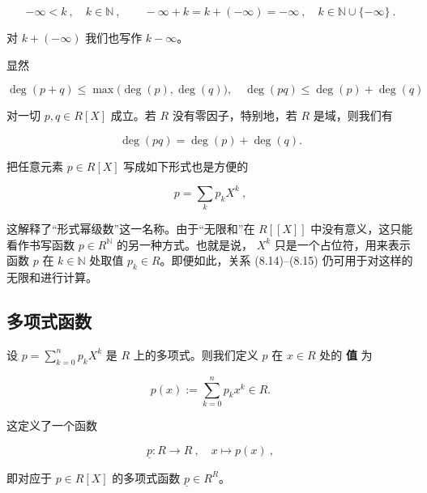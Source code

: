 \begin{equation}
-\infty<k~,\quad k\in\mathbb{N}~,\qquad-\infty+k=k+(-\infty)=-\infty~,\quad k\in\mathbb{N}\cup\{-\infty\}~.
\end{equation}

对  $ k + (-\infty) $ 我们也写作  $ k - \infty $。

显然

\begin{equation}
\deg(p+q)\leq\max\bigl(\deg(p),\deg(q)\bigr),\quad\deg(pq)\leq\deg(p)+\deg(q)
\end{equation}

对一切 $p, q \in R[X]$ 成立。若 $R$ 没有零因子，特别地，若 $R$ 是域，则我们有

\begin{equation}
\deg(pq)=\deg(p)+\deg(q).
\end{equation}

把任意元素  $ p \in R[X] $ 写成如下形式也是方便的

\begin{equation}
p=\sum_{k}p_{k}X^{k}~,
\end{equation}

这解释了“形式幂级数”这一名称。由于“无限和”在  $ R[[X]] $ 中没有意义，这只能看作书写函数  $ p \in R^{\mathbb{N}} $ 的另一种方式。也就是说， $ X^k $ 只是一个占位符，用来表示函数  $ p $ 在  $ k \in \mathbb{N} $ 处取值  $ p_k \in R $。即便如此，关系 (8.14)–(8.15) 仍可用于对这样的无限和进行计算。

\subsection*{多项式函数}

设  $ p = \sum_{k=0}^{n} p_k X^k $ 是 $ R $ 上的多项式。则我们定义 $ p $ 在 $ x \in R $ 处的 \textbf{值} 为

\[
p(x):=\sum_{k=0}^{n}p_{k}x^{k}\in R.
\]

这定义了一个函数

\begin{equation}
\underline{{p}}\colon R\to R~,\quad x\mapsto p(x)~,
\end{equation}

即对应于 $ p \in R[X] $ 的多项式函数 $ \underline{p} \in R^R $。

